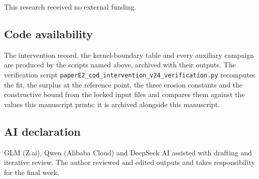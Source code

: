 \documentclass[11pt]{article}
\begin{document}
This research received no external funding.

\subsection*{Code availability}

The intervention record, the kernel-boundary table and every auxiliary
campaign are produced by the scripts named above, archived with their
outputs. The verification script
\texttt{paperE2\_cod\_intervention\_v24\_verification.py} recomputes
the fit, the surplus at the reference point, the three erosion
constants and the constructive bound from the locked input files and
compares them against the values this manuscript prints; it is archived
alongside this manuscript.

\subsection*{AI declaration}
GLM (Z.ai), Qwen (Alibaba Cloud) and DeepSeek AI assisted with drafting
and iterative review. The author reviewed and edited outputs and takes
responsibility for the final work.
\end{document}
